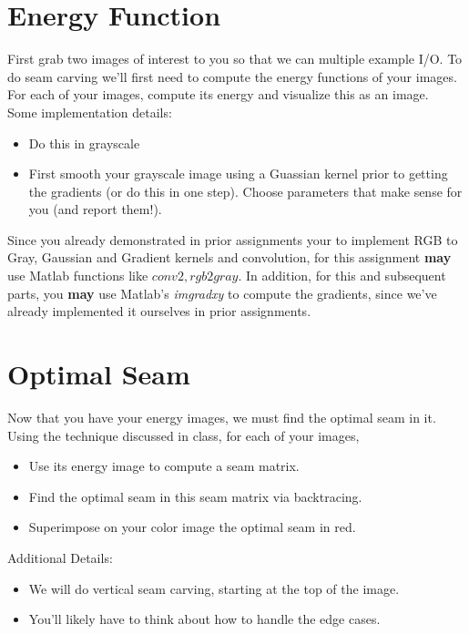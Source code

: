 \documentclass[12pt]{article}
\begin{document}
\newpage
\section{Energy Function}
First grab two images of interest to you so that we can multiple example I/O.   To do seam carving we'll first need to compute the energy functions of your images.\\

\noindent
For each of your images, compute its energy and visualize this as an image.\\

\noindent
Some implementation details:
\begin{itemize}
\item Do this in grayscale
\item First smooth your grayscale image using a Guassian kernel prior to getting the gradients (or do this in one step).  Choose parameters that make sense for you (and report them!).
\end{itemize}

\noindent
Since you already demonstrated in prior assignments your to implement RGB to Gray, Gaussian and Gradient kernels and convolution, for this assignment \textbf{may} use Matlab functions like $conv2, rgb2gray$.  In addition, for this and subsequent parts, you \textbf{may} use Matlab's \emph{imgradxy} to compute the gradients, since we've already implemented it ourselves in prior assignments.\\

\newpage

\section{Optimal Seam}
Now that you have your energy images, we must find the optimal seam in it.\\

\noindent
Using the technique discussed in class, for each of your images, 

\begin{itemize}
\item Use its energy image to compute a seam matrix.
\item Find the optimal seam in this seam matrix via backtracing.
\item Superimpose on your color image the optimal seam in red.
\end{itemize}

\noindent
Additional Details:
\begin{itemize}
\item We will do vertical seam carving, starting at the top of the image.
\item You’ll likely have to think about how to handle the edge cases.
\end{itemize}
\end{document}
